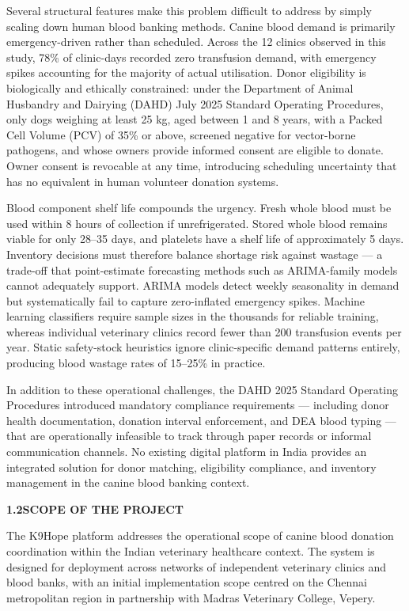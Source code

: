 \documentclass[12pt,a4paper]{article}
\begin{document}
\noindent Several structural features make this problem difficult to address by simply scaling down human blood banking methods. Canine blood demand is primarily emergency-driven rather than scheduled. Across the 12 clinics observed in this study, 78\% of clinic-days recorded zero transfusion demand, with emergency spikes accounting for the majority of actual utilisation. Donor eligibility is biologically and ethically constrained: under the Department of Animal Husbandry and Dairying (DAHD) July 2025 Standard Operating Procedures, only dogs weighing at least 25 kg, aged between 1 and 8 years, with a Packed Cell Volume (PCV) of 35\% or above, screened negative for vector-borne pathogens, and whose owners provide informed consent are eligible to donate. Owner consent is revocable at any time, introducing scheduling uncertainty that has no equivalent in human volunteer donation systems.

\noindent Blood component shelf life compounds the urgency. Fresh whole blood must be used within 8 hours of collection if unrefrigerated. Stored whole blood remains viable for only 28--35 days, and platelets have a shelf life of approximately 5 days. Inventory decisions must therefore balance shortage risk against wastage — a trade-off that point-estimate forecasting methods such as ARIMA-family models cannot adequately support. ARIMA models detect weekly seasonality in demand but systematically fail to capture zero-inflated emergency spikes. Machine learning classifiers require sample sizes in the thousands for reliable training, whereas individual veterinary clinics record fewer than 200 transfusion events per year. Static safety-stock heuristics ignore clinic-specific demand patterns entirely, producing blood wastage rates of 15--25\% in practice.

\noindent In addition to these operational challenges, the DAHD 2025 Standard Operating Procedures introduced mandatory compliance requirements — including donor health documentation, donation interval enforcement, and DEA blood typing — that are operationally infeasible to track through paper records or informal communication channels. No existing digital platform in India provides an integrated solution for donor matching, eligibility compliance, and inventory management in the canine blood banking context.

\vspace{1.5em}
\noindent\textbf{1.2\quad SCOPE OF THE PROJECT}
\vspace{0.6em}

\noindent The K9Hope platform addresses the operational scope of canine blood donation coordination within the Indian veterinary healthcare context. The system is designed for deployment across networks of independent veterinary clinics and blood banks, with an initial implementation scope centred on the Chennai metropolitan region in partnership with Madras Veterinary College, Vepery.
\end{document}
